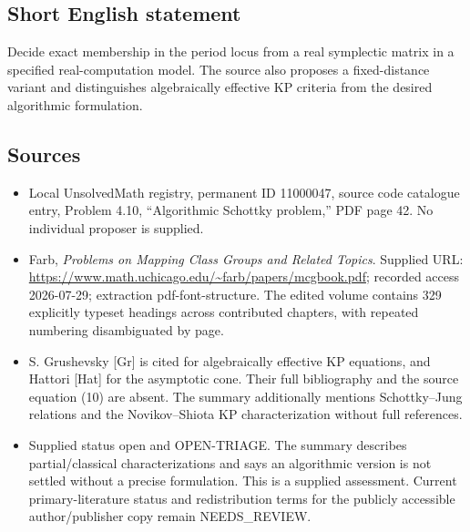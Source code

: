\documentclass[11pt]{article}
\begin{document}
\subsection{Short English statement}
Decide exact membership in the period locus from a real symplectic matrix in a specified real-computation model. The source also proposes a fixed-distance variant and distinguishes algebraically effective KP criteria from the desired algorithmic formulation.
\subsection{Sources}
\begin{itemize}
\item Local UnsolvedMath registry, permanent ID 11000047, source code catalogue entry, Problem 4.10, ``Algorithmic Schottky problem,'' PDF page 42. No individual proposer is supplied.
\item Farb, \emph{Problems on Mapping Class Groups and Related Topics}. Supplied URL: \url{https://www.math.uchicago.edu/~farb/papers/mcgbook.pdf}; recorded access 2026-07-29; extraction pdf-font-structure. The edited volume contains 329 explicitly typeset headings across contributed chapters, with repeated numbering disambiguated by page.
\item S. Grushevsky [Gr] is cited for algebraically effective KP equations, and Hattori [Hat] for the asymptotic cone. Their full bibliography and the source equation (10) are absent. The summary additionally mentions Schottky--Jung relations and the Novikov--Shiota KP characterization without full references.
\item Supplied status open and OPEN-TRIAGE. The summary describes partial/classical characterizations and says an algorithmic version is not settled without a precise formulation. This is a supplied assessment. Current primary-literature status and redistribution terms for the publicly accessible author/publisher copy remain NEEDS\_REVIEW.
\end{itemize}
\end{document}
